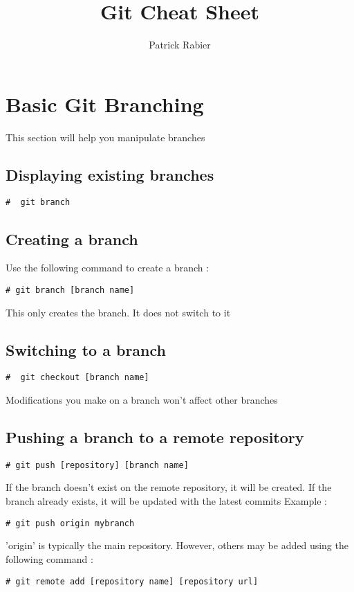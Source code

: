 \documentclass{article}
\title{Git Cheat Sheet}
\author{Patrick Rabier}
\begin{document}
\maketitle

\section{Basic Git Branching}

This section will help you manipulate branches

\subsection{Displaying existing branches}
\begin{lstlisting}[style=BashInputStyle]
    #  git branch
\end{lstlisting}

\subsection{Creating a branch}
Use the following command to create a branch :
\begin{lstlisting}[style=BashInputStyle]
    # git branch [branch name]
\end{lstlisting}
This only creates the branch. It does not switch to it

\subsection{Switching to a branch}
\begin{lstlisting}[style=BashInputStyle]
    #  git checkout [branch name]
\end{lstlisting}
Modifications you make on a branch won't affect other branches

\subsection{Pushing a branch to a remote repository}
\begin{lstlisting}[style=BashInputStyle]
    # git push [repository] [branch name]
\end{lstlisting}
If the branch doesn't exist on the remote repository, it will be created.
If the branch already exists, it will be updated with the latest commits
Example :
\begin{lstlisting}[style=BashInputStyle]
    # git push origin mybranch
\end{lstlisting}
'origin' is typically the main repository. However, others may be added using the following command :
\begin{lstlisting}[style=BashInputStyle]
    # git remote add [repository name] [repository url]
\end{lstlisting}
\end{document}
